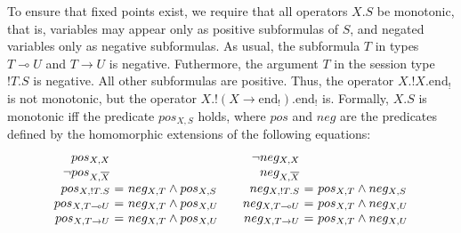 \documentclass[orivec,envcountsame]{llncs}
\makeatletter
\newcommand{\gvdual}[1]{\overline{#1}}
\newcommand{\gvout}[2]{{!#1.#2}}
\newcommand{\lto}{\ensuremath{\multimap}}
\newcommand{\uto}{\ensuremath{\rightarrow}}
\newcommand{\outterm}{\mathrm{end}_!}
\newcommand{\ba}{\begin{array}}
\newcommand{\ea}{\end{array}}
\newenvironment{eqs}{\ba{@{}r@{~}c@{~}l@{}}}{\ea}
\makeatother
\begin{document}
To ensure that fixed points exist, we require that all operators $X.S$ be monotonic, that is,
variables may appear only as positive subformulas of $S$, and negated variables only as negative
subformulas. As usual, the subformula $T$ in types $T \lto U$ and $T \uto U$ is
negative. Futhermore, the argument $T$ in the session type $\gvout{T}{S}$ is negative. All other
subformulas are positive. Thus, the operator $X.\gvout{X}{\outterm}$ is not monotonic, but the
operator $X.\gvout{(X \uto \outterm)}{\outterm}$ is.
%
Formally, $X.S$ is monotonic iff the predicate $pos_{X,S}$ holds, where $pos$ and $neg$ are the
predicates defined by the homomorphic extensions of the following equations:
\[
\ba{@{}c@{\qquad}c@{}}
\begin{eqs}
pos_{X,X} \\
\neg pos_{X,\gvdual{X}} \\
pos_{X,!T.S} &=& neg_{X,T} \wedge pos_{X,S} \\
pos_{X,T \lto U} &=& neg_{X,T} \wedge pos_{X,U} \\
pos_{X,T \uto U} &=& neg_{X,T} \wedge pos_{X,U} \\
\end{eqs}
&
\begin{eqs}
\neg neg_{X,X} \\
neg_{X,\gvdual{X}} \\
neg_{X,!T.S} &=& pos_{X,T} \wedge neg_{X,S} \\
neg_{X,T \lto U} &=& pos_{X,T} \wedge neg_{X,U} \\
neg_{X,T \uto U} &=& pos_{X,T} \wedge neg_{X,U} \\
\end{eqs}
\ea
\]
\end{document}
